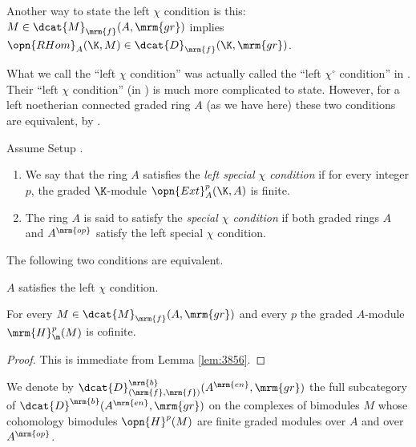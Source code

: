 Another way to state the left $\chi$ condition is this: 
$M \in \dcat{M}_{\mrm{f}}(A, \mrm{gr})$ implies 
$\opn{RHom}_{A}(\K, M) \in \dcat{D}_{\mrm{f}}(\K, \mrm{gr})$.

\begin{rem} \label{rem:3855}
What we call the ``left $\chi$ condition'' was actually called the ``left 
$\chi^{\circ}$ condition'' in \cite[Definition 3.2]{ArZh}. 
Their ``left $\chi$ condition'' 
(in \cite[Definition 3.7]{ArZh}) is much more complicated to state. 
However, for a left noetherian connected graded ring $A$ (as we have here) 
these two conditions are equivalent, by \cite[Proposition 3.11(2)]{ArZh}. 
\end{rem}

\begin{dfn} \label{dfn:3711} 
Assume Setup \tup{\ref{setup:3855} }.
\begin{enumerate}
\item We say that the ring $A$ satisfies the {\em left special $\chi$ 
condition} if for every integer $p$, the graded $\K$-module 
$\opn{Ext}^p_{A}(\K, A)$ is finite. 

\item The ring $A$ is said to satisfy the 
{\em special $\chi$ condition}%
if both graded rings $A$ and $A^{\mrm{op}}$ satisfy the left special $\chi$ 
condition.
\end{enumerate}
\end{dfn}

\begin{prop} \label{prop:3855}
The following two conditions are equivalent.
\begin{enumerate}
 $A$ satisfies the left $\chi$ condition. 

 For every $M \in \dcat{M}_{\mrm{f}}(A, \mrm{gr})$ and every $p$ 
the graded $A$-module $\mrm{H}^p_{\m}(M)$ is cofinite. 
\end{enumerate}
\end{prop}

\begin{proof}
This is immediate from Lemma \ref{lem:3856}. 
\end{proof}

\begin{dfn} \label{dfn:4050} 
We denote by 
$\dcat{D}^{\mrm{b}}_{(\mrm{f}, \mrm{f})}(A^{\mrm{en}}, \mrm{gr})$ the 
full subcategory of \lb 
$\dcat{D}^{\mrm{b}}(A^{\mrm{en}}, \mrm{gr})$ on the 
complexes of bimodules $M$ whose cohomology bimodules $\opn{H}^p(M)$ are 
finite graded modules over $A$ and over $A^{\mrm{op}}$. 
\end{dfn}


